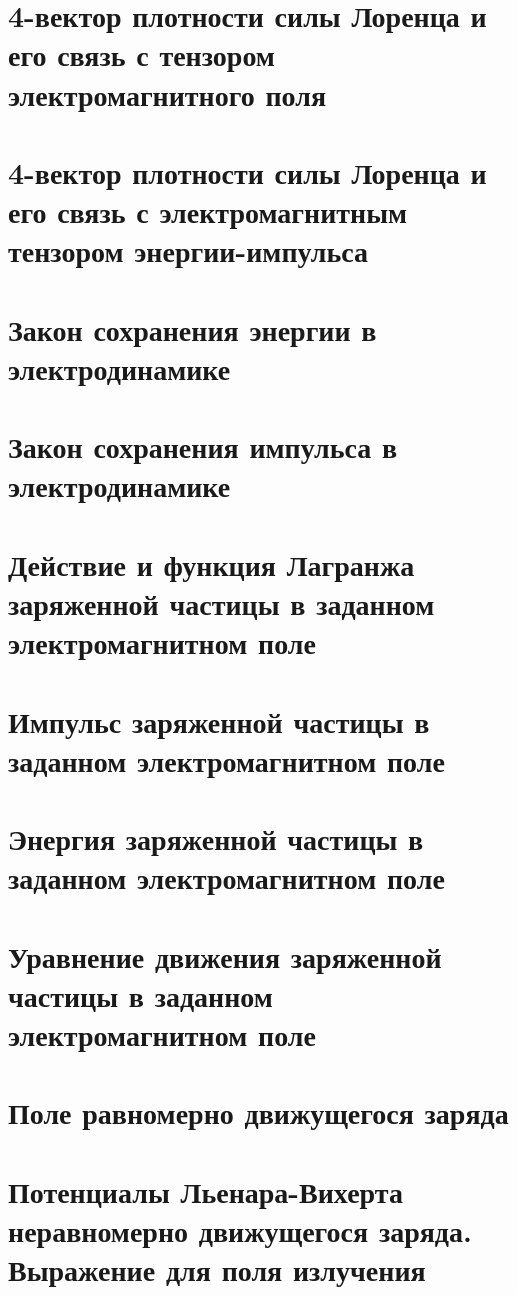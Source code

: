 \begin{multicols*}{2}
		\section{4-вектор плотности силы Лоренца и его связь с тензором электромагнитного поля}
		
		\section{4-вектор плотности силы Лоренца и его связь с электромагнитным тензором энергии-импульса}
		
		\section{Закон сохранения энергии в электродинамике}
		
		\section{Закон сохранения импульса в электродинамике}
		
		\section{Действие и функция Лагранжа заряженной частицы в заданном электромагнитном поле}
		
		\section{Импульс заряженной частицы в заданном электромагнитном поле}
		
		\section{Энергия заряженной частицы в заданном электромагнитном поле}
		
		\section{Уравнение движения заряженной частицы в заданном электромагнитном поле}
		
		\section{Поле равномерно движущегося заряда}
		
		\section{Потенциалы Льенара-Вихерта неравномерно движущегося заряда. Выражение для поля излучения}
		

\end{multicols*}

